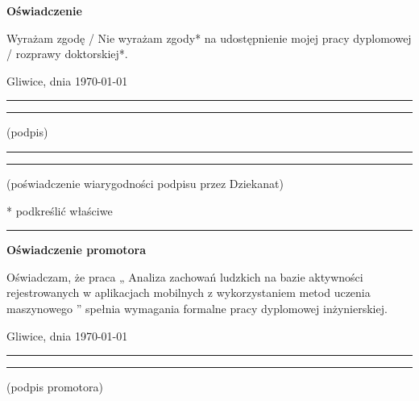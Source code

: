 \documentclass[a4paper,twoside,12pt]{book}
\newcommand{\tytul}{
Analiza zachowań ludzkich na bazie aktywności rejestrowanych 
w aplikacjach mobilnych z wykorzystaniem metod uczenia maszynowego
}
\begin{document}
\vfill  

\begin{center}
\Large\bfseries Oświadczenie
\end{center}

\vfill

Wyrażam  zgodę / Nie wyrażam zgody*  na  udostępnienie  mojej  pracy  dyplomowej / rozprawy doktorskiej*.

\vfill

Gliwice, dnia \today

\vfill

\rule{0.5\textwidth}{0cm}\dotfill 

\rule{0.5\textwidth}{0cm}
\begin{minipage}{0.45\textwidth}
{\begin{center}(podpis)\end{center}}
\end{minipage} 

\vfill

\rule{0.5\textwidth}{0cm}\dotfill 

\rule{0.5\textwidth}{0cm}
\begin{minipage}{0.45\textwidth}
{\begin{center}\rule{0mm}{5mm}(poświadczenie wiarygodności podpisu przez Dziekanat)\end{center}}
\end{minipage}


\vfill

* podkreślić właściwe

 


\cleardoublepage

\rule{1cm}{0cm}

\vfill  

\begin{center}
\Large\bfseries Oświadczenie promotora
\end{center}

\vfill

Oświadczam, że praca „\tytul” spełnia wymagania formalne pracy dyplomowej inżynierskiej.

\vfill



\vfill

Gliwice, dnia \today

\rule{0.5\textwidth}{0cm}\dotfill 

\rule{0.5\textwidth}{0cm}
\begin{minipage}{0.45\textwidth}
{\begin{center}(podpis promotora)\end{center}}
\end{minipage} 
\end{document}
